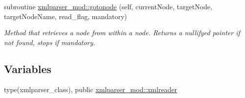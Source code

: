 \begin{DoxyCompactItemize}
subroutine \mbox{\hyperlink{namespacexmlparser__mod_acd860c3d06a25fc422edbcc3d356d976}{xmlparser\+\_\+mod\+::gotonode}} (self, current\+Node, target\+Node, target\+Node\+Name, read\+\_\+flag, mandatory)
\begin{DoxyCompactList}\small\item\em Method that retrieves a node from within a node. Returns a nullifyed pointer if not found, stops if mandatory. \end{DoxyCompactList}\end{DoxyCompactItemize}
\subsection*{Variables}
\begin{DoxyCompactItemize}
\item 
type(xmlparser\+\_\+class), public \mbox{\hyperlink{namespacexmlparser__mod_a482bd93d0a4ba8c9c2000713a4b14799}{xmlparser\+\_\+mod\+::xmlreader}}
\end{DoxyCompactItemize}
